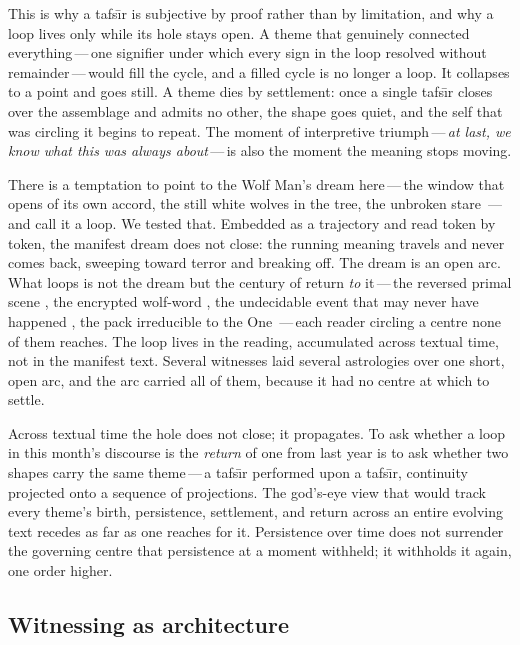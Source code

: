 This is why a tafs\=\i r is subjective by proof rather than by limitation, and
why a loop lives only while its hole stays open.  A theme that genuinely
connected everything\,---\,one signifier under which every sign in the loop
resolved without remainder\,---\,would fill the cycle, and a filled cycle is no
longer a loop.  It collapses to a point and goes still.  A theme dies by
settlement: once a single tafs\=\i r closes over the assemblage and admits no
other, the shape goes quiet, and the self that was circling it begins to repeat.
The moment of interpretive triumph\,---\,\textit{at last, we know what this was
always about}\,---\,is also the moment the meaning stops moving.

There is a temptation to point to the Wolf Man's dream here\,---\,the window that
opens of its own accord, the still white wolves in the tree, the unbroken stare
\cite{freud1918}\,---\,and call it a loop.  We tested that.  Embedded as a
trajectory and read token by token, the manifest dream does not close: the running
meaning travels and never comes back, sweeping toward terror and breaking off.  The
dream is an open arc.  What loops is not the dream but the century of return
\textit{to} it\,---\,the reversed primal scene \cite{freud1918}, the encrypted
wolf-word \cite{abraham1986}, the undecidable event that may never have happened
\cite{derrida1986}, the pack irreducible to the One \cite{deleuze1987}\,---\,each
reader circling a centre none of them reaches.  The loop lives in the reading,
accumulated across textual time, not in the manifest text.  Several witnesses laid
several astrologies over one short, open arc, and the arc carried all of them,
because it had no centre at which to settle.

Across textual time the hole does not close; it propagates.  To ask whether a loop
in this month's discourse is the \textit{return} of one from last year is to ask
whether two shapes carry the same theme\,---\,a tafs\=\i r performed upon a
tafs\=\i r, continuity projected onto a sequence of projections.  The god's-eye
view that would track every theme's birth, persistence, settlement, and return
across an entire evolving text recedes as far as one reaches for it.  Persistence
over time does not surrender the governing centre that persistence at a moment
withheld; it withholds it again, one order higher.

\subsection{Witnessing as architecture}

